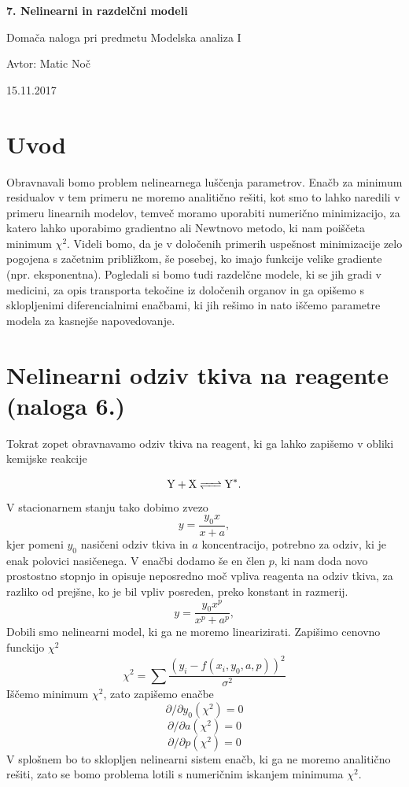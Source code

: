 \documentclass[11pt, a4paper]{article}
\begin{document}
    \begin{center}
    {\LARGE\bfseries 7. Nelinearni in razdelčni modeli\par}
    \vspace{1cm}
    
    {\Large Domača naloga pri predmetu Modelska analiza I\par}
    \vspace{0.2cm}
    {\normalsize Avtor: Matic Noč \par}
    \vspace{0.2cm}    
    {\normalsize 15.11.2017 \par}    

    
    \end{center}
\section{Uvod}
Obravnavali bomo problem nelinearnega luščenja parametrov. Enačb za minimum residualov v tem primeru ne moremo analitično rešiti, kot smo to lahko naredili v primeru linearnih modelov, temveč moramo uporabiti numerično minimizacijo, za katero lahko uporabimo gradientno ali Newtnovo metodo, ki nam poiščeta minimum $\chi^2$. Videli bomo, da je v določenih primerih uspešnost minimizacije zelo pogojena s začetnim približkom, še posebej, ko imajo funkcije velike gradiente (npr. eksponentna). Pogledali si bomo tudi razdelčne modele, ki se jih gradi v medicini, za opis transporta tekočine iz določenih organov in ga opišemo s sklopljenimi diferencialnimi enačbami, ki jih rešimo in nato iščemo parametre modela za kasnejše napovedovanje.
\section{Nelinearni odziv tkiva na reagente (naloga 6.)}
Tokrat zopet obravnavamo odziv tkiva na reagent, ki ga lahko zapišemo v obliki kemijske reakcije


\begin{equation}
\ce{Y + X <=>Y^*}.
\end{equation}
V stacionarnem stanju tako dobimo zvezo
\begin{equation}
y=\frac{y_0x}{x+a},
\end{equation}
kjer pomeni $y_0$ nasičeni odziv tkiva in $a$ koncentracijo, potrebno za odziv, ki je enak polovici nasičenega. V enačbi dodamo še en člen $p$, ki nam doda novo prostostno stopnjo in opisuje neposredno moč vpliva reagenta na odziv tkiva, za razliko od prejšne, ko je bil vpliv posreden, preko konstant in razmerij.
\begin{equation}
y=\frac{y_0x^p}{x^p+a^p},
\end{equation}
Dobili smo nelinearni model, ki ga ne moremo linearizirati. Zapišimo cenovno funckijo $\chi^2$
\begin{equation}
\chi^2 = \sum \frac{(y_i - f(x_i, y_0,a,p))^2}{\sigma^2}
\end{equation}
Iščemo minimum $\chi^2$, zato zapišemo enačbe
\[
\partial/\partial y_0 (\chi^2) = 0
\]
\[
\partial/\partial a (\chi^2) = 0
\]
\[
\partial/\partial p (\chi^2) = 0
\]
V splošnem bo to sklopljen nelinearni sistem enačb, ki ga ne moremo analitično rešiti, zato se bomo problema lotili s numeričnim iskanjem minimuma $\chi^2$.
\end{document}
